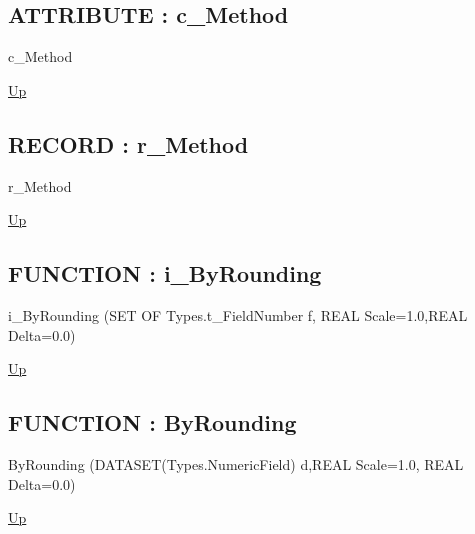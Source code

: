 \subsection*{ATTRIBUTE : c\_Method}
\hypertarget{ecldoc:ecldoc-c_Method}{}
\begin{minipage}[t]{\textwidth}
\begin{flushleft}
 c\_Method 
\end{flushleft}
\end{minipage}
\hyperlink{ecldoc:ML_Core.Discretize}{Up}

\par
\par
\subsection*{RECORD : r\_Method}
\hypertarget{ecldoc:ml_core.discretize.r_method}{}
\begin{minipage}[t]{\textwidth}
\begin{flushleft}
 r\_Method 
\end{flushleft}
\end{minipage}
\hyperlink{ecldoc:ML_Core.Discretize}{Up}

\par
\par
\subsection*{FUNCTION : i\_ByRounding}
\hypertarget{ecldoc:ml_core.discretize.i_byrounding}{}
\begin{minipage}[t]{\textwidth}
\begin{flushleft}
 i\_ByRounding (SET OF Types.t\_FieldNumber f, REAL Scale=1.0,REAL Delta=0.0)
\end{flushleft}
\end{minipage}
\hyperlink{ecldoc:ML_Core.Discretize}{Up}

\par
\par
\subsection*{FUNCTION : ByRounding}
\hypertarget{ecldoc:ml_core.discretize.byrounding}{}
\begin{minipage}[t]{\textwidth}
\begin{flushleft}
 ByRounding (DATASET(Types.NumericField) d,REAL Scale=1.0, REAL Delta=0.0)
\end{flushleft}
\end{minipage}
\hyperlink{ecldoc:ML_Core.Discretize}{Up}

